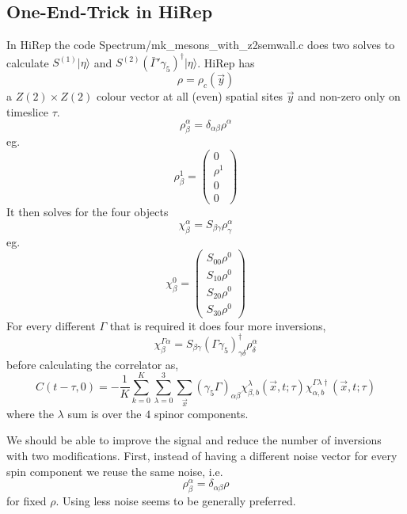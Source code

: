 \documentclass[3p,preprint]{elsarticle}
\begin{document}
\subsection{One-End-Trick in HiRep}
In HiRep the code Spectrum/mk\_mesons\_with\_z2semwall.c does two solves to calculate $S^{(1)} | \eta \rangle $ and $S^{(2)} (\bar{ \Gamma }' \gamma_5)^{\dagger} | \eta \rangle $.
HiRep has
\begin{equation}
\rho = \rho_{ c }(\vec{y})
\end{equation}
a $Z(2) \times Z(2)$ colour vector at all (even) spatial sites $\vec{y}$ and non-zero only on timeslice $\tau$.
\begin{equation}
\rho^{\alpha}_\beta = \delta_{\alpha \beta} \rho^\alpha
\end{equation}
eg.
$$
\rho^1_\beta = \left( \begin{matrix}
  0 \\
  \rho^1 \\
  0 \\
  0
 \end{matrix} \right)
$$
It then solves for the four objects
\begin{equation}
\chi^\alpha_\beta = S_{\beta \gamma} \rho^{\alpha}_\gamma
\end{equation}
eg.
$$
\chi^0_\beta = \left( \begin{matrix}
  S_{00} \rho^0 \\
  S_{10} \rho^0 \\
  S_{20} \rho^0 \\
  S_{30} \rho^0
 \end{matrix} \right)
$$
For every different $\Gamma$ that is required it does four more inversions,
\begin{equation}
\chi^{\Gamma \alpha}_\beta = S_{\beta \gamma} (\Gamma \gamma_5)^\dagger_{\gamma \delta} \rho^{\alpha}_\delta
\end{equation}
before calculating the correlator as,
\begin{equation}
C(t - \tau, 0) = -\frac{1}{K} \sum_{k = 0}^{K} \sum_{\lambda = 0}^{3}\sum_{\vec{x} } (\gamma_5 \Gamma)_{\alpha \beta} \chi^{\lambda}_{\beta, b}(\vec{x}, t; \tau) \chi^{\Gamma \lambda \dagger}_{\alpha, b}(\vec{x}, t; \tau)
\end{equation}
where the $\lambda$ sum is over the $4$ spinor components.

We should be able to improve the signal and reduce the number of inversions with two modifications.
First, instead of having a different noise vector for every spin component we reuse the same noise, i.e.
\begin{equation}
\rho^{\alpha}_\beta = \delta_{\alpha \beta} \rho
\end{equation}
for fixed $\rho$. Using less noise seems to be generally preferred.
\end{document}
